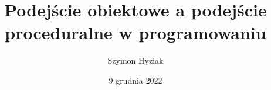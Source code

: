 \usepackage[utf8]{inputenc}
\usepackage[hidelinks]{hyperref}
\usepackage[T1]{fontenc}
\usepackage[framemethod=tikz]{mdframed}

\title{Podejście obiektowe a podejście proceduralne w programowaniu}
\author{Szymon Hyziak}
\date{9 grudnia 2022}

\renewcommand*{\contentsname}{Spis treści}
\renewcommand\refname{Źródła}

